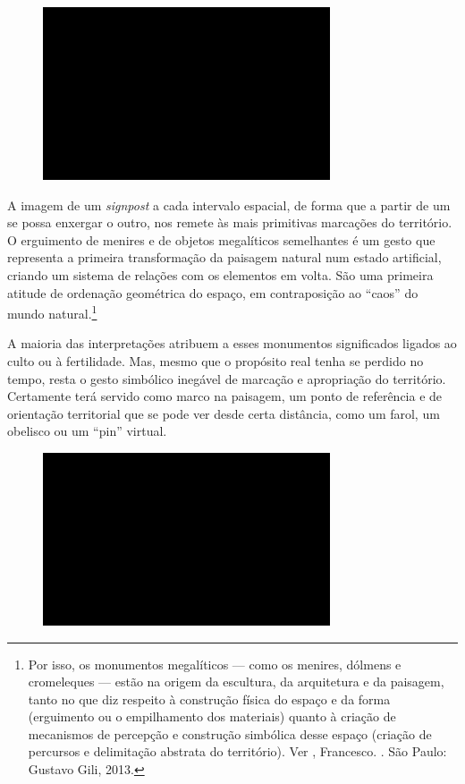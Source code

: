 \begin{figure}[!ht]

\centering
 \includegraphics[width=85mm]{./imgs/im1.jpg}
\caption{\tiny{}}

\end{figure}

A imagem de um \emph{signpost} a cada intervalo espacial, de forma que a
partir de um se possa enxergar o outro, nos remete às mais primitivas
marcações do território. O erguimento de menires e de objetos
megalíticos semelhantes é um gesto que representa a primeira
transformação da paisagem natural num estado artificial, criando um
sistema de relações com os elementos em volta. São uma primeira atitude
de ordenação geométrica do espaço, em contraposição ao ``caos'' do mundo
natural.\footnote{Por isso, os monumentos megalíticos --- como os
  menires, dólmens e cromeleques --- estão na origem da escultura, da
  arquitetura e da paisagem, tanto no que diz respeito à construção
  física do espaço e da forma (erguimento ou o empilhamento dos
  materiais) quanto à criação de mecanismos de percepção e construção
  simbólica desse espaço (criação de percursos e delimitação abstrata do
  território). Ver , Francesco. {}. São Paulo: Gustavo Gili, 2013.}

A maioria das interpretações atribuem a esses monumentos significados
ligados ao culto ou à fertilidade. Mas, mesmo que o propósito real tenha
se perdido no tempo, resta o gesto simbólico inegável de marcação e
apropriação do território. Certamente terá servido como marco na
paisagem, um ponto de referência e de orientação territorial que se pode
ver desde certa distância, como um farol, um obelisco ou um ``pin''
virtual.

\begin{figure}[!ht]

\centering
 \includegraphics[width=85mm]{./imgs/im1.jpg}
\caption{\tiny{}}

\end{figure}

